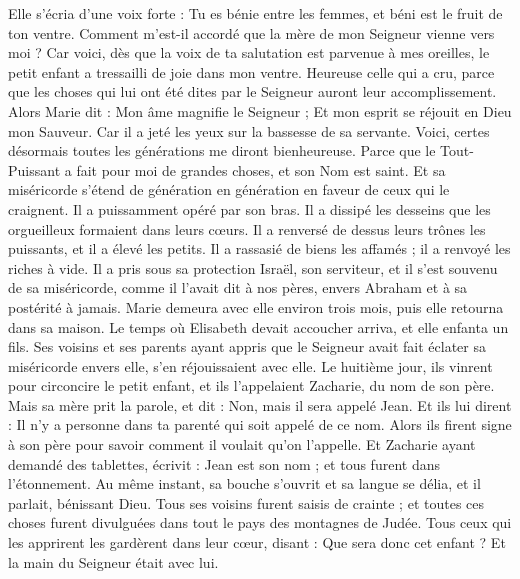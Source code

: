 \begin{multicols}{2}
Elle s'écria d’une voix forte : Tu es bénie entre les femmes, et béni est le fruit de ton ventre.
Comment m’est-il accordé que la mère de mon Seigneur vienne vers moi ?
Car voici, dès que la voix de ta salutation est parvenue à mes oreilles, le petit enfant a tressailli de joie dans mon ventre.
Heureuse celle qui a cru, parce que les choses qui lui ont été dites par le Seigneur auront leur accomplissement.
Alors Marie dit : Mon âme magnifie le Seigneur ;
Et mon esprit se réjouit en Dieu mon Sauveur.
Car il a jeté les yeux sur la bassesse de sa servante. Voici, certes désormais toutes les générations me diront bienheureuse.
Parce que le Tout-Puissant a fait pour moi de grandes choses, et son Nom est saint.
Et sa miséricorde s’étend de génération en génération en faveur de ceux qui le craignent.
Il a puissamment opéré par son bras. Il a dissipé les desseins que les orgueilleux formaient dans leurs cœurs.
Il a renversé de dessus leurs trônes les puissants, et il a élevé les petits.
Il a rassasié de biens les affamés ; il a renvoyé les riches à vide.
Il a pris sous sa protection Israël, son serviteur, et il s’est souvenu de sa miséricorde,
comme il l’avait dit à nos pères, envers Abraham et à sa postérité à jamais.
Marie demeura avec elle environ trois mois, puis elle retourna dans sa maison.
Le temps où Elisabeth devait accoucher arriva, et elle enfanta un fils.
Ses voisins et ses parents ayant appris que le Seigneur avait fait éclater sa miséricorde envers elle, s'en réjouissaient avec elle.
Le huitième jour, ils vinrent pour circoncire le petit enfant, et ils l'appelaient Zacharie, du nom de son père.
Mais sa mère prit la parole, et dit : Non, mais il sera appelé Jean.
Et ils lui dirent : Il n'y a personne dans ta parenté qui soit appelé de ce nom.
Alors ils firent signe à son père pour savoir comment il voulait qu’on l’appelle.
Et Zacharie ayant demandé des tablettes, écrivit : Jean est son nom ; et tous furent dans l’étonnement.
Au même instant, sa bouche s’ouvrit et sa langue se délia, et il parlait, bénissant Dieu.
Tous ses voisins furent saisis de crainte ; et toutes ces choses furent divulguées dans tout le pays des montagnes de Judée.
Tous ceux qui les apprirent les gardèrent dans leur cœur, disant : Que sera donc cet enfant ? Et la main du Seigneur était avec lui.

\end{multicols}
